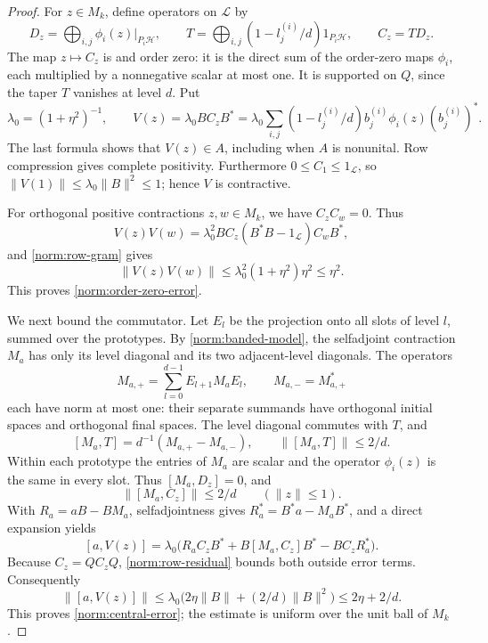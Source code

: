 \begin{proof}
For \(z\in M_k\), define operators on \(\mathcal L\) by
\[
 D_z=\bigoplus_{i,j}\phi_i(z)|_{P_i\mathcal H},\qquad
 T=\bigoplus_{i,j}(1-l_j^{(i)}/d)1_{P_i\mathcal H},\qquad
 C_z=TD_z .
\]
The map \(z\mapsto C_z\) is \cpc and order zero: it is the direct
sum of the order-zero maps \(\phi_i\), each multiplied by a
nonnegative scalar at most one.  It is supported on \(Q\), since
the taper \(T\) vanishes at level \(d\).
Put
\begin{equation}\label{norm:row-map}
 \lambda_0=(1+\eta^2)^{-1},\qquad
 V(z)=\lambda_0 BC_zB^*
     =\lambda_0\sum_{i,j}(1-l_j^{(i)}/d)
                    b_j^{(i)}\phi_i(z)(b_j^{(i)})^* .
\end{equation}
The last formula shows that \(V(z)\in A\), including when \(A\)
is nonunital.  Row compression gives complete positivity.
Furthermore \(0\le C_1\le1_{\mathcal L}\), so
\(\|V(1)\|\le\lambda_0\|B\|^2\le1\); hence \(V\) is contractive.

For orthogonal positive contractions \(z,w\in M_k\), we have
\(C_zC_w=0\).  Thus
\[
 V(z)V(w)
   =\lambda_0^2 BC_z(B^*B-1_{\mathcal L})C_wB^*,
\]
and \eqref{norm:row-gram} gives
\[
 \|V(z)V(w)\|
       \le\lambda_0^2(1+\eta^2)\eta^2
       \le\eta^2 .
\]
This proves \eqref{norm:order-zero-error}.

We next bound the commutator.  Let \(E_l\) be the projection onto
all slots of level \(l\), summed over the prototypes.  By
\eqref{norm:banded-model}, the selfadjoint contraction \(M_a\)
has only its level diagonal and its two adjacent-level diagonals.
The operators
\[
 M_{a,+}=\sum_{l=0}^{d-1}E_{l+1}M_aE_l,\qquad
 M_{a,-}=M_{a,+}^*
\]
each have norm at most one: their separate summands have
orthogonal initial spaces and orthogonal final spaces.  The
level diagonal commutes with \(T\), and
\[
 [M_a,T]=d^{-1}(M_{a,+}-M_{a,-}),\qquad
 \|[M_a,T]\|\le2/d .
\]
Within each prototype the entries of \(M_a\) are scalar and the
operator \(\phi_i(z)\) is the same in every slot.  Thus
\([M_a,D_z]=0\), and
\begin{equation}\label{norm:taper-bound}
 \|[M_a,C_z]\|\le2/d\qquad(\|z\|\le1).
\end{equation}
With \(R_a=aB-BM_a\), selfadjointness gives
\(R_a^*=B^*a-M_aB^*\), and a direct expansion yields
\[
 [a,V(z)]
 =\lambda_0\big(R_aC_zB^*+
                 B[M_a,C_z]B^*-BC_zR_a^*\big).
\]
Because \(C_z=QC_zQ\), \eqref{norm:row-residual} bounds both
outside error terms.  Consequently
\[
 \|[a,V(z)]\|
 \le\lambda_0\big(2\eta\|B\|+(2/d)\|B\|^2\big)
 \le2\eta+2/d .
\]
This proves \eqref{norm:central-error}; the estimate is uniform
over the unit ball of \(M_k\).


\end{proof}
